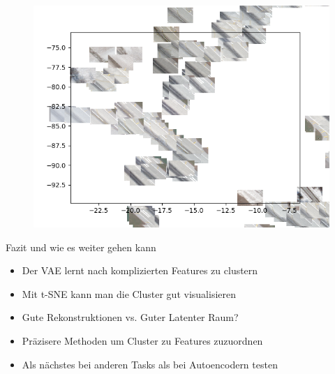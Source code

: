 \begin{frame}
	\begin{figure}
		\includegraphics[width=\textwidth]
		{images/figures/experiments_latent/convolutional_dim50_images_sideways_street3.png}
	\end{figure}
\end{frame}

\begin{frame}{Fazit und wie es weiter gehen kann}
	\begin{itemize}
		\item Der VAE lernt nach komplizierten Features zu clustern
		\item Mit t-SNE kann man die Cluster gut visualisieren
		\item Gute Rekonstruktionen vs. Guter Latenter Raum?
		\item Präzisere Methoden um Cluster zu Features zuzuordnen
		\item Als nächstes bei anderen Tasks als bei Autoencodern testen
	\end{itemize}
\end{frame}